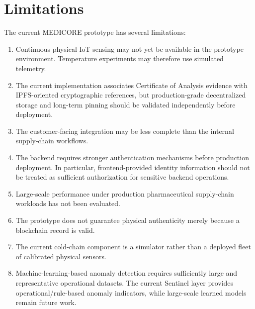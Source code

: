 \documentclass[11pt,a4paper]{article}
\begin{document}
\section{Limitations}
The current MEDICORE prototype has several limitations:
\begin{enumerate}
    \item Continuous physical IoT sensing may not yet be available in the prototype environment. Temperature experiments may therefore use simulated telemetry.
    \item The current implementation associates Certificate of Analysis evidence with IPFS-oriented cryptographic references, but production-grade decentralized storage and long-term pinning should be validated independently before deployment.
    \item The customer-facing integration may be less complete than the internal supply-chain workflows.
    \item The backend requires stronger authentication mechanisms before production deployment. In particular, frontend-provided identity information should not be treated as sufficient authorization for sensitive backend operations.
    \item Large-scale performance under production pharmaceutical supply-chain workloads has not been evaluated.
    \item The prototype does not guarantee physical authenticity merely because a blockchain record is valid.
    \item The current cold-chain component is a simulator rather than a deployed fleet of calibrated physical sensors.
    \item Machine-learning-based anomaly detection requires sufficiently large and representative operational datasets. The current Sentinel layer provides operational/rule-based anomaly indicators, while large-scale learned models remain future work.
\end{enumerate}
\end{document}
